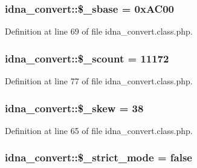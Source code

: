 \hypertarget{classidna__convert_ab4e5849131d5a242fc67d3bb75f81899}{
\subsubsection[{\$\-\_\-sbase}]{\setlength{\rightskip}{0pt plus 5cm}idna\-\_\-convert\-::\$\-\_\-sbase = 0x\-A\-C00\hspace{0.3cm}{\ttfamily [protected]}}}\label{classidna__convert_ab4e5849131d5a242fc67d3bb75f81899}


Definition at line 69 of file idna\-\_\-convert.\-class.\-php.

\hypertarget{classidna__convert_aa422586662f0878841bd8dcda663c058}{
\subsubsection[{\$\-\_\-scount}]{\setlength{\rightskip}{0pt plus 5cm}idna\-\_\-convert\-::\$\-\_\-scount = 11172\hspace{0.3cm}{\ttfamily [protected]}}}\label{classidna__convert_aa422586662f0878841bd8dcda663c058}


Definition at line 77 of file idna\-\_\-convert.\-class.\-php.

\hypertarget{classidna__convert_ae444bd5e85604ec097705a95ab21f144}{
\subsubsection[{\$\-\_\-skew}]{\setlength{\rightskip}{0pt plus 5cm}idna\-\_\-convert\-::\$\-\_\-skew = 38\hspace{0.3cm}{\ttfamily [protected]}}}\label{classidna__convert_ae444bd5e85604ec097705a95ab21f144}


Definition at line 65 of file idna\-\_\-convert.\-class.\-php.

\hypertarget{classidna__convert_a6457ade57cb55c7b44bfbf8686c2c2d5}{
\subsubsection[{\$\-\_\-strict\-\_\-mode}]{\setlength{\rightskip}{0pt plus 5cm}idna\-\_\-convert\-::\$\-\_\-strict\-\_\-mode = false\hspace{0.3cm}{\ttfamily [protected]}}}\label{classidna__convert_a6457ade57cb55c7b44bfbf8686c2c2d5}


